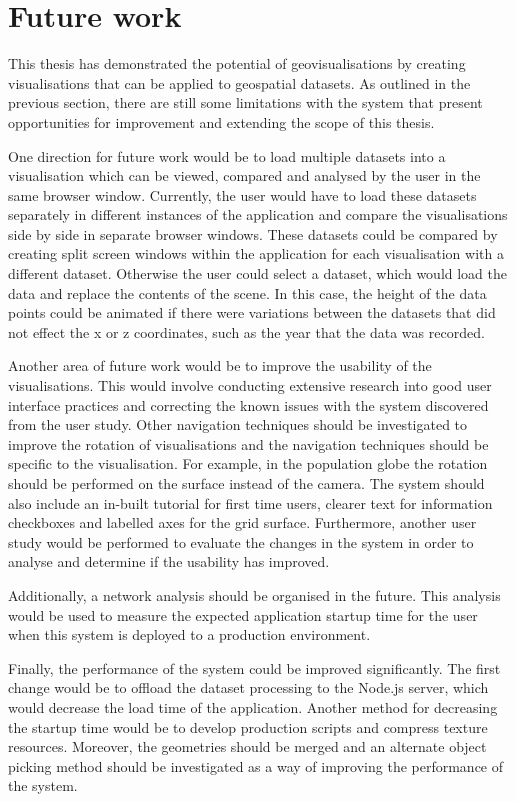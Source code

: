 \section{Future work} {
\label{sec:future_work}

	This thesis has demonstrated the potential of geovisualisations by creating visualisations that can be applied to geospatial datasets. As outlined in the previous section, there are still some limitations with the system that present opportunities for improvement and extending the scope of this thesis.

	One direction for future work would be to load multiple datasets into a visualisation which can be viewed, compared and analysed by the user in the same browser window. Currently, the user would have to load these datasets separately in different instances of the application and compare the visualisations side by side in separate browser windows. These datasets could be compared by creating split screen windows within the application for each visualisation with a different dataset. Otherwise the user could select a dataset, which would load the data and replace the contents of the scene. In this case, the height of the data points could be animated if there were variations between the datasets that did not effect the x or z coordinates, such as the year that the data was recorded.

	Another area of future work would be to improve the usability of the visualisations. This would involve conducting extensive research into good user interface practices and correcting the known issues with the system discovered from the user study. Other navigation techniques should be investigated to improve the rotation of visualisations and the navigation techniques should be specific to the visualisation. For example, in the population globe the rotation should be performed on the surface instead of the camera. The system should also include an in-built tutorial for first time users, clearer text for information checkboxes and labelled axes for the grid surface. Furthermore, another user study would be performed to evaluate the changes in the system in order to analyse and determine if the usability has improved.

	Additionally, a network analysis should be organised in the future. This analysis would be used to measure the expected application startup time for the user when this system is deployed to a production environment.

	Finally, the performance of the system could be improved significantly. The first change would be to offload the dataset processing to the Node.js server, which would decrease the load time of the application. Another method for decreasing the startup time would be to develop production scripts and compress texture resources. Moreover, the geometries should be merged and an alternate object picking method should be investigated as a way of improving the performance of the system.

}
